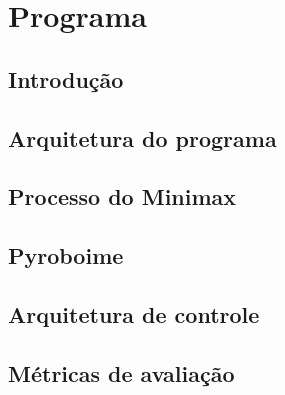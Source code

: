 \chapter{Programa}\label{cap:programa}
\section{Introdução}
\section{Arquitetura do programa}
\section{Processo do Minimax}
\section{Pyroboime}
\section{Arquitetura de controle}
\section{Métricas de avaliação}
